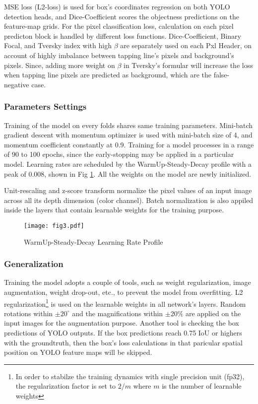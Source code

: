 \documentclass[default,pdflatex,iicol]{sn-jnl}%
\begin{document}
MSE loss (L2-loss) is used for box's coordinates regression on both YOLO detection heads, and Dice-Coefficient scores the objectness predictions on the feature-map grids. For the pixel classification loss, calculation on each pixel predicton block is handled by different loss functions. Dice-Coefficient, Binary Focal, and Tversky index with high $\beta$  are separately used on each Pxl Header, on account of highly imbalance between tapping line's pixels and background's pixels. Since, adding more weight on $\beta$ in Tversky's formular \cite{tverskyloss} will increase the loss when tapping line pixels are predicted as background, which are the false-negative case.

\subsubsection{Parameters Settings}\label{subsubsec-trainingparams}
Training of the model on every folds shares same training parameters. Mini-batch gradient descent with momentum optimizer is used with mini-batch size of 4, and momentum coefficient constantly at 0.9. Training for a model processes in a range of 90 to 100 epochs, since the early-stopping may be applied in a particular model. Learning rates are scheduled by the WarmUp-Steady-Decay profile with a peak of 0.008, shown in Fig \ref{fig3-LR}. All the weights on the model are newly initialized. 

Unit-rescaling and z-score transform normalize the pixel values of an input image across all its depth dimension (color channel). Batch normalization is also appiled inside the layers that contain learnable weights for the training purpose.

\begin{figure}[h]%
\centering
\texttt{[image: fig3.pdf]}
\caption{WarmUp-Steady-Decay Learning Rate Profile}\label{fig3-LR}
\end{figure}

\subsubsection{Generalization}
Training the model adopts a couple of tools, such as weight regularization, image augmentation, weight drop-out, etc., to prevent the model from overfitting. L2 regularization\footnote[2]{In order to stabilze the training dynamics with single precision unit (fp32), the regularization factor is set to $2/m$ where $m$ is the number of learnable weights} is used on the learnable weights in all network's layers. Random rotations within $\pm20^\circ$ and the magnifications within $\pm20\%$ are applied on the input images for the augmentation purpose. Another tool is checking the box predictions of YOLO outputs. If the box predictions reach 0.75 IoU or highers with the groundtruth, then the box's loss calculations in that paricular spatial position on YOLO feature maps will be skipped.
\end{document}
